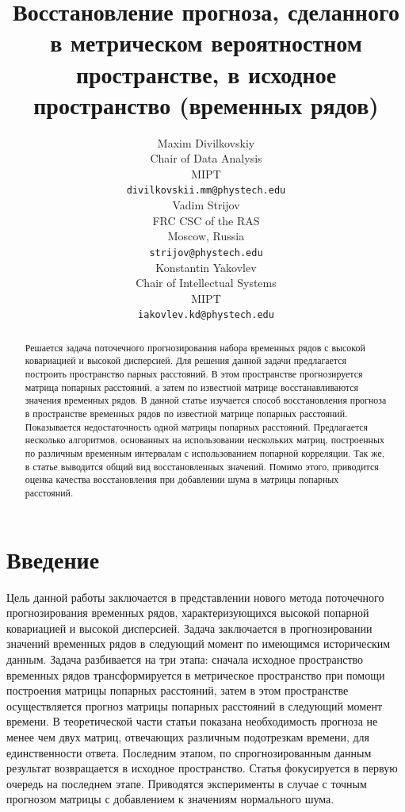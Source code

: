 \documentclass{article}
\title{Восстановление прогноза, сделанного в метрическом вероятностном пространстве, в исходное пространство (временных рядов)}
\author{ Maxim Divilkovskiy \\
	Chair of Data Analysis\\
	MIPT\\
	\texttt{divilkovskii.mm@phystech.edu} \\
	\And
	Vadim Strijov \\
	FRC CSC of the RAS\\
	Moscow, Russia\\
    \texttt{strijov@phystech.edu} \\
    \And
    Konstantin Yakovlev \\
    Chair of Intellectual Systems\\
    MIPT\\
    \texttt{iakovlev.kd@phystech.edu} \\
}
\date{}
\begin{document}
\maketitle

\begin{abstract}
	Решается задача поточечного прогнозирования набора временных рядов с высокой ковариацией и высокой дисперсией. Для решения данной задачи предлагается построить пространство парных расстояний. В этом пространстве прогнозируется матрица попарных расстояний, а затем по известной матрице восстанавливаются значения временных рядов.
	В данной статье изучается способ восстановления прогноза в пространстве временных рядов по известной матрице попарных расстояний. Показывается недостаточность одной матрицы попарных расстояний. Предлагается несколько алгоритмов, основанных на использовании нескольких матриц, построенных по различным временным интервалам с использованием попарной корреляции. Так же, в статье выводится общий вид восстановленных значений. Помимо этого, приводится оценка качества восстановления при добавлении шума в матрицы попарных расстояний.


\end{abstract}



\section{Введение}
	Цель данной работы заключается в представлении нового метода поточечного прогнозирования временных рядов, характеризующихся высокой попарной ковариацией и высокой дисперсией. Задача заключается в прогнозировании значений временных рядов в следующий момент по имеющимся историческим данным. Задача разбивается на три этапа: сначала исходное пространство временных рядов трансформируется в метрическое пространство при помощи построения матрицы попарных расстояний, затем в этом пространстве осуществляется прогноз матрицы попарных расстояний в следующий момент времени. В теоретической части статьи показана необходимость прогноза не менее чем двух матриц, отвечающих различным подотрезкам времени, для единственности ответа. Последним этапом, по спрогнозированным данным результат возвращается в исходное пространство. Статья фокусируется в первую очередь на последнем этапе. Приводятся эксперименты в случае с точным прогнозом матрицы с добавлением к значениям нормального шума.
		
\end{document}
